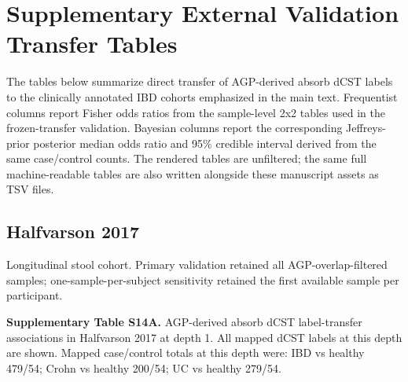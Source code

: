 \clearpage
\section*{Supplementary External Validation Transfer Tables}

The tables below summarize direct transfer of AGP-derived absorb dCST labels to the clinically annotated IBD cohorts emphasized in the main text. Frequentist columns report Fisher odds ratios from the sample-level 2x2 tables used in the frozen-transfer validation. Bayesian columns report the corresponding Jeffreys-prior posterior median odds ratio and 95\% credible interval derived from the same case/control counts. The rendered tables are unfiltered; the same full machine-readable tables are also written alongside these manuscript assets as TSV files.

\subsection*{Halfvarson 2017}
Longitudinal stool cohort. Primary validation retained all AGP-overlap-filtered samples; one-sample-per-subject sensitivity retained the first available sample per participant.

\noindent\textbf{Supplementary Table S14A.} AGP-derived absorb dCST label-transfer associations in Halfvarson 2017 at depth 1. All mapped dCST labels at this depth are shown. Mapped case/control totals at this depth were: IBD vs healthy 479/54; Crohn vs healthy 200/54; UC vs healthy 279/54.

